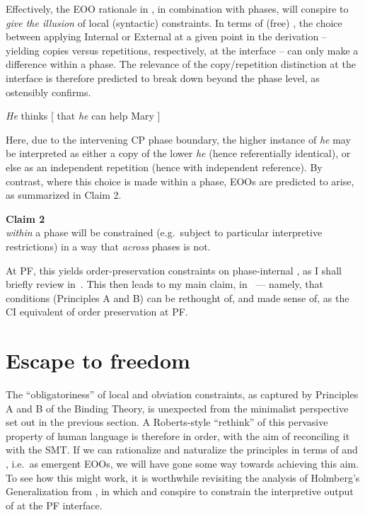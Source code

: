 \documentclass[output=paper]{langsci/langscibook}
\begin{document}
Effectively, the \gls{EOO} rationale in , in combination with
phases, will conspire to \emph{give the illusion} of local (syntactic)
constraints. In terms of (free) , the choice between applying Internal or
External  at a given point in the derivation -- yielding copies versus
repetitions, respectively, at the interface -- can only make a difference
within a phase. The relevance of the copy/repetition distinction at the
interface is therefore predicted to break down beyond the phase level, as
 ostensibly confirms.

\ea\label{ex:key:22.3}
    \emph{He} thinks [ that \emph{he} can help Mary ]
\z

Here, due to the intervening CP phase boundary, the higher instance of
\emph{he} may be interpreted as either a copy of the lower \emph{he} (hence
referentially identical), or else as an independent repetition (hence with
independent reference). By contrast, where this choice is made within a phase,
\glspl{EOO} are predicted to arise, as summarized in Claim 2.

\ea\label{ex:key:22.4}\textbf{Claim 2}\\
     \emph{within} a phase will be constrained (e.g.\ subject to
    particular interpretive restrictions) in a way that  \emph{across}
    phases is not.
\z

At \gls{PF}, this yields order-preservation constraints on phase-internal 
\parencite{Richards2004,Richards2007b}, as I shall briefly review
in~. This then leads to my main claim,
in~ --- namely, that  conditions (Principles A and
B) can be rethought of, and made sense of, as the \gls{CI} equivalent of order
preservation at \gls{PF}.

\section{Escape to freedom}\label{sec:key:22.2}

The \enquote{obligatoriness} of local  and obviation constraints, as
captured by Principles A and B of the Binding Theory, is unexpected from the
minimalist perspective set out in the previous section. A Roberts-style
\enquote{rethink} of this pervasive property of human language is therefore in order,
with the aim of reconciling it with the \gls{SMT}. If we can rationalize and
naturalize the  principles in terms of  and
, i.e.\ as emergent \glspl{EOO}, we will have gone some way towards
achieving this aim. To see how this might work, it is worthwhile revisiting the
analysis of Holmberg’s Generalization from \citealt{Richards2004}, in which
 and  conspire to constrain the interpretive output
of  at the \gls{PF} interface.
\end{document}
